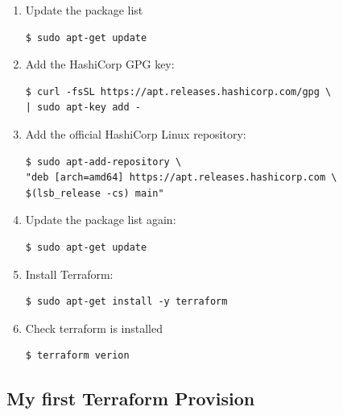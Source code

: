 \documentclass{article}
\newenvironment{codetemplate}[1][]{%
  \mybasecolorbox[#1]
  \itshape
}{%
  \endmybasecolorbox
}
\begin{document}
\begin{enumerate}
    \item Update the package list
\begin{codetemplate}{}
\begin{verbatim}
$ sudo apt-get update
\end{verbatim}
\end{codetemplate}

    \item Add the HashiCorp GPG key:
\begin{codetemplate}{}
\begin{verbatim}
$ curl -fsSL https://apt.releases.hashicorp.com/gpg \ 
| sudo apt-key add -
\end{verbatim}
\end{codetemplate}

    \item Add the official HashiCorp Linux repository:
\begin{codetemplate}{}
\begin{verbatim}
$ sudo apt-add-repository \
"deb [arch=amd64] https://apt.releases.hashicorp.com \
$(lsb_release -cs) main"
\end{verbatim}
\end{codetemplate}

    
    \item Update the package list again:
\begin{codetemplate}{}
\begin{verbatim}
$ sudo apt-get update
\end{verbatim}
\end{codetemplate}

    \item Install Terraform:
\begin{codetemplate}{}
\begin{verbatim}
$ sudo apt-get install -y terraform
\end{verbatim}
\end{codetemplate}

    \item Check terraform is installed
\begin{codetemplate}{}
\begin{verbatim}
$ terraform verion
\end{verbatim}
\end{codetemplate}
\end{enumerate}

\subsection{My first Terraform Provision}
\end{document}
